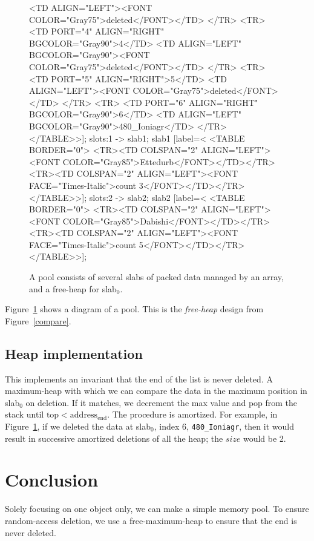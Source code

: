 \documentclass[12pt]{article}
\newcommand{\code}[1]{\colorbox{light-gray}{\texttt{#1}}}
\begin{document}
\begin{figure}
{		<TD ALIGN="LEFT"><FONT COLOR="Gray75">deleted</FONT></TD>
	</TR>
	<TR>
		<TD PORT="4" ALIGN="RIGHT" BGCOLOR="Gray90">4</TD>
		<TD ALIGN="LEFT" BGCOLOR="Gray90"><FONT COLOR="Gray75">deleted</FONT></TD>
	</TR>
	<TR>
		<TD PORT="5" ALIGN="RIGHT">5</TD>
		<TD ALIGN="LEFT"><FONT COLOR="Gray75">deleted</FONT></TD>
	</TR>
	<TR>
		<TD PORT="6" ALIGN="RIGHT" BGCOLOR="Gray90">6</TD>
		<TD ALIGN="LEFT" BGCOLOR="Gray90">480_Ioniagr</TD>
	</TR>
</TABLE>>];
	slots:1 -> slab1;
	slab1 [label=<
<TABLE BORDER="0">
	<TR><TD COLSPAN="2" ALIGN="LEFT"><FONT COLOR="Gray85">Ettedurb</FONT></TD></TR>
	<TR><TD COLSPAN="2" ALIGN="LEFT"><FONT FACE="Times-Italic">count 3</FONT></TD></TR>
</TABLE>>];
	slots:2 -> slab2;
	slab2 [label=<
<TABLE BORDER="0">
	<TR><TD COLSPAN="2" ALIGN="LEFT"><FONT COLOR="Gray85">Dabishi</FONT></TD></TR>
	<TR><TD COLSPAN="2" ALIGN="LEFT"><FONT FACE="Times-Italic">count 5</FONT></TD></TR>
</TABLE>>];
	}
	\caption{A pool consists of several slabs of packed data managed by an array, and a free-heap for slab$_0$.}
	\label{pool}
\end{figure}

Figure~\ref{pool} shows a diagram of a pool. This is the {\it free-heap} design from Figure~\ref{compare}.

\subsection{Heap implementation}

This implements an invariant that the end of the list is never deleted. A maximum-heap with which we can compare the data in the maximum position in slab$_0$ on deletion. If it matches, we decrement the max value and pop from the stack until $\text{top} < \text{address}_\text{end}$. The procedure is amortized. For example, in Figure~\ref{pool}, if we deleted the data at slab$_0$, index 6, \code{480\_Ioniagr}, then it would result in successive amortized deletions of all the heap; the $size$ would be 2.


\section{Conclusion}

Solely focusing on one object only, we can make a simple memory pool. To ensure random-access deletion, we use a free-maximum-heap to ensure that the end is never deleted.


\end{document}
